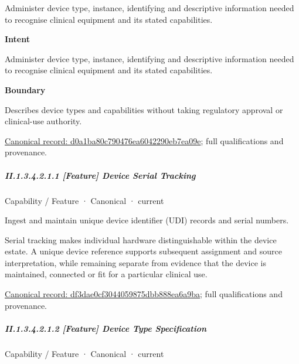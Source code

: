 Administer device type, instance, identifying and descriptive information needed to recognise clinical equipment and its stated capabilities.



\textbf{Intent}



Administer device type, instance, identifying and descriptive information needed to recognise clinical equipment and its stated capabilities.



\textbf{Boundary}



Describes device types and capabilities without taking regulatory approval or clinical-use authority.


{\footnotesize \href{../../../../../../../continuum/strategy/capability/d0a1ba80c790476ea6042290eb7ea09e.md}{Canonical record: d0a1ba80c790476ea6042290eb7ea09e}; full qualifications and provenance.}\par
\subparagraph*{II.1.3.4.2.1.1 [Feature] Device Serial Tracking}
\label{navigation:II.1.3.4.2.1.1}

\label{element:df3dae0cf3044059875dbb888ea6a9ba}
{\small Capability / Feature · Canonical · current}\par

Ingest and maintain unique device identifier (UDI) records and serial numbers.



Serial tracking makes individual hardware distinguishable within the device estate. A unique device reference supports subsequent assignment and source interpretation, while remaining separate from evidence that the device is maintained, connected or fit for a particular clinical use.


{\footnotesize \href{../../../../../../../continuum/strategy/capability/feature/df3dae0cf3044059875dbb888ea6a9ba.md}{Canonical record: df3dae0cf3044059875dbb888ea6a9ba}; full qualifications and provenance.}\par
\subparagraph*{II.1.3.4.2.1.2 [Feature] Device Type Specification}
\label{navigation:II.1.3.4.2.1.2}

\label{element:ca6d91b03b56415790810846649a3dca}
{\small Capability / Feature · Canonical · current}\par

